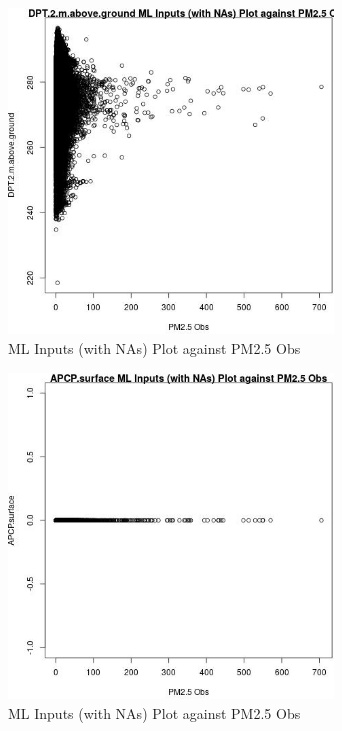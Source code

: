\begin{figure} 
\centering  
\includegraphics[width=0.77\textwidth]{Code_Outputs/Report_ML_input_PM25_Step4_part_e_de_duplicated_aves_compiled_2019-05-14wNAs_DPT2mabovegroundvPM25_Obs.jpg} 
\caption{\label{fig:Report_ML_input_PM25_Step4_part_e_de_duplicated_aves_compiled_2019-05-14wNAsDPT2mabovegroundvPM25_Obs}ML Inputs (with NAs) Plot against PM2.5 Obs} 
\end{figure} 
 

\clearpage 

\begin{figure} 
\centering  
\includegraphics[width=0.77\textwidth]{Code_Outputs/Report_ML_input_PM25_Step4_part_e_de_duplicated_aves_compiled_2019-05-14wNAs_APCPsurfacevPM25_Obs.jpg} 
\caption{\label{fig:Report_ML_input_PM25_Step4_part_e_de_duplicated_aves_compiled_2019-05-14wNAsAPCPsurfacevPM25_Obs}ML Inputs (with NAs) Plot against PM2.5 Obs} 
\end{figure} 
 

